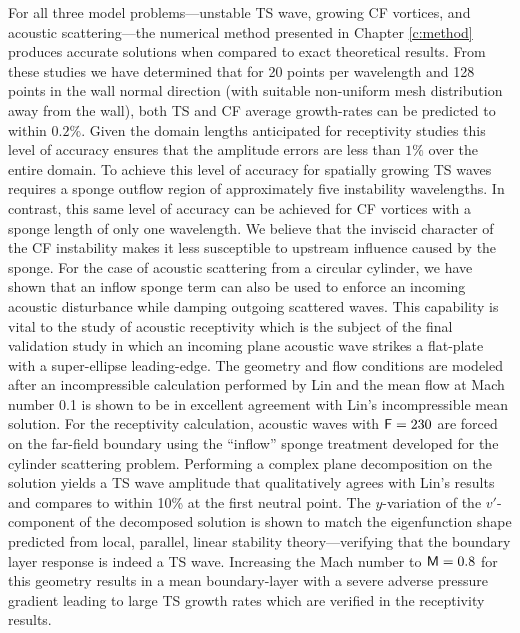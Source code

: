 For all three model problems---unstable TS wave, growing CF vortices, and
acoustic scattering---the numerical method presented in Chapter \ref{c:method}
produces accurate solutions when compared to exact theoretical results.  From
these studies we have determined that for 20 points per wavelength and 128
points in the wall normal direction (with suitable non-uniform mesh
distribution away from the wall), both TS and CF average growth-rates can be
predicted to within $0.2\%$.  Given the domain lengths anticipated for
receptivity studies this level of accuracy ensures that the amplitude errors
are less than $1\%$ over the entire domain.  To achieve this level of accuracy
for spatially growing TS waves requires a sponge outflow region of
approximately five instability wavelengths.  In contrast, this same level of
accuracy can be achieved for CF vortices with a sponge length of only one
wavelength.  We believe that the inviscid character of the CF instability
makes it less susceptible to upstream influence caused by the sponge.  For the
case of acoustic scattering from a circular cylinder, we have shown that an
inflow sponge term can also be used to enforce an incoming acoustic
disturbance while damping outgoing scattered waves.  This capability is vital
to the study of acoustic receptivity which is the subject of the final
validation study in which an incoming plane acoustic wave strikes a flat-plate
with a super-ellipse leading-edge.  The geometry and flow conditions are
modeled after an incompressible calculation performed by Lin \cite{Lin:92} and
the mean flow at Mach number 0.1 is shown to be in excellent agreement with
Lin's incompressible mean solution.  For the receptivity calculation, acoustic
waves with ${\sf F}=230$ are forced on the far-field boundary using the ``inflow''
sponge treatment developed for the cylinder scattering problem.  Performing a
complex plane decomposition\cite{Wlezien:94} on the solution yields a TS wave
amplitude that qualitatively agrees with Lin's results and compares to within
10\% at the first neutral point.  The $y$-variation of the $v'$-component of
the decomposed solution is shown to match the eigenfunction shape predicted
from local, parallel, linear stability theory---verifying that the boundary
layer response is indeed a TS wave.  Increasing the Mach number to ${\sf M}=0.8$
for this geometry results in a mean boundary-layer with a severe adverse
pressure gradient leading to large TS growth rates which are verified in the
receptivity results.

